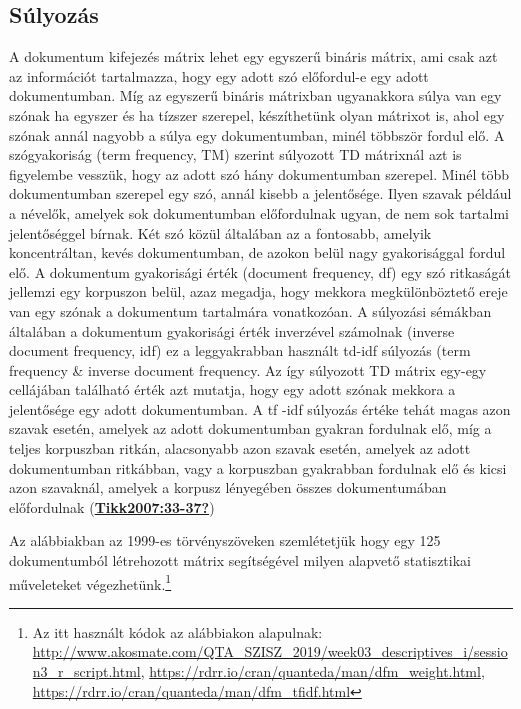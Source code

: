 \documentclass[
]{book}
\begin{document}
\hypertarget{suxfalyozuxe1s}{%
\subsection{Súlyozás}\label{suxfalyozuxe1s}}

A dokumentum kifejezés mátrix lehet egy egyszerű bináris mátrix, ami
csak azt az információt tartalmazza, hogy egy adott szó előfordul-e egy
adott dokumentumban. Míg az egyszerű bináris mátrixban ugyanakkora súlya
van egy szónak ha egyszer és ha tízszer szerepel, készíthetünk olyan
mátrixot is, ahol egy szónak annál nagyobb a súlya egy dokumentumban,
minél többször fordul elő. A szógyakoriság (term frequency, TM) szerint
súlyozott TD mátrixnál azt is figyelembe vesszük, hogy az adott szó hány
dokumentumban szerepel. Minél több dokumentumban szerepel egy szó, annál
kisebb a jelentősége. Ilyen szavak például a névelők, amelyek sok
dokumentumban előfordulnak ugyan, de nem sok tartalmi jelentőséggel
bírnak. Két szó közül általában az a fontosabb, amelyik koncentráltan,
kevés dokumentumban, de azokon belül nagy gyakorisággal fordul elő. A
dokumentum gyakorisági érték (document frequency, df) egy szó ritkaságát
jellemzi egy korpuszon belül, azaz megadja, hogy mekkora megkülönböztető
ereje van egy szónak a dokumentum tartalmára vonatkozóan. A súlyozási
sémákban általában a dokumentum gyakorisági érték inverzével számolnak
(inverse document frequency, idf) ez a leggyakrabban használt td-idf
súlyozás (term frequency \& inverse document frequency. Az így súlyozott
TD mátrix egy-egy cellájában található érték azt mutatja, hogy egy adott
szónak mekkora a jelentősége egy adott dokumentumban. A tf -idf súlyozás
értéke tehát magas azon szavak esetén, amelyek az adott dokumentumban
gyakran fordulnak elő, míg a teljes korpuszban ritkán, alacsonyabb azon
szavak esetén, amelyek az adott dokumentumban ritkábban, vagy a
korpuszban gyakrabban fordulnak elő és kicsi azon szavaknál, amelyek a
korpusz lényegében összes dokumentumában előfordulnak
(\protect\hyperlink{ref-Tikk2007:33-37}{\textbf{Tikk2007:33-37?}})

Az alábbiakban az 1999-es törvényszöveken szemlétetjük hogy egy 125
dokumentumból létrehozott mátrix segítségével milyen alapvető
statisztikai műveleteket végezhetünk.\footnote{Az itt használt kódok az
  alábbiakon alapulnak:
  \url{http://www.akosmate.com/QTA_SZISZ_2019/week03_descriptives_i/session3_r_script.html},
  \url{https://rdrr.io/cran/quanteda/man/dfm_weight.html},
  \url{https://rdrr.io/cran/quanteda/man/dfm_tfidf.html}}
\end{document}
